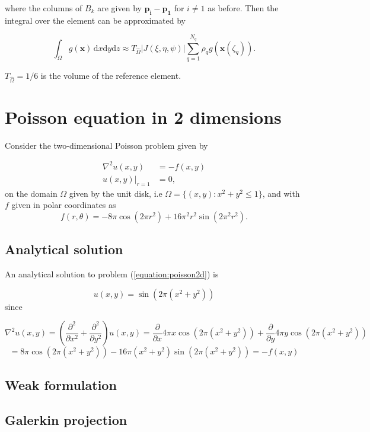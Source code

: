 \documentclass[paper=a4, fontsize=11pt]{scrartcl} %
\begin{document}
where the columns of $B_k$ are given by $\mathbf{p_i}-\mathbf{p_1}$ for $i\neq1$ as before. Then the integral over the element can be approximated by

\[ \int_{\Omega} \! g(\mathbf{x}) \, \mathrm{d}x\mathrm{d}y\mathrm{d}z  \approx T_{\hat{\Omega}} |J(\xi,\eta,\psi)| \sum_{q=1}^{N_q} \rho_{q}g(\mathbf{x}(\zeta_q)).
\]

$T_{\hat{\Omega}}=1/6$ is the volume of the reference element.

\section{Poisson equation in 2 dimensions}

Consider the two-dimensional Poisson problem given by 

\begin{equation}
\begin{aligned}
\nabla^2u(x,y) 	&= -f(x,y) \\
u(x,y)|_{r=1} 	&= 0,
\end{aligned}
\label{equation:poisson2d}
\end{equation}
on the domain $\Omega$ given by the unit disk, i.e $\Omega = \{(x,y) : x^2+y^2\leq 1\}$, and with $f$ given in polar coordinates as
\[ f(r,\theta)= -8\pi \cos(2\pi r^2)+16\pi^2r^2\sin(2\pi^2 r^2).\]

\subsection{Analytical solution}
An analytical solution to problem (\ref{equation:poisson2d}) is 

\begin{equation}
u(x,y)=\sin\left(2\pi(x^2+y^2)\right)
\label{equation:poisson2danal}
\end{equation}
since

\[\nabla^2u(x,y) = \left( \frac{\partial^2}{\partial x^2} + \frac{\partial^2}{\partial y^2} \right) u(x,y) = \frac{\partial}{\partial x} 4\pi x\cos\left(2\pi(x^2+y^2)\right) + \frac{\partial}{\partial y} 4\pi y\cos\left(2\pi(x^2+y^2)\right)
\]\[= 8\pi\cos\left(2\pi(x^2+y^2)\right) -16\pi(x^2+y^2)\sin\left(2\pi(x^2+y^2)\right) = -f(x,y)\]

\subsection{Weak formulation}


\subsection{Galerkin projection}
\end{document}
